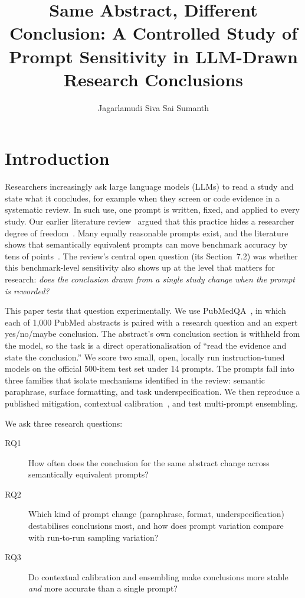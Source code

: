 \documentclass[acmsmall,nonacm]{acmart}
\title{Same Abstract, Different Conclusion: A Controlled Study of Prompt Sensitivity in LLM-Drawn Research Conclusions}
\author{Jagarlamudi Siva Sai Sumanth}
\affiliation{%
  \institution{Indian Institute of Information Technology Allahabad}
  \city{Prayagraj}
  \country{India}}
\begin{document}
\maketitle

\section{Introduction}
\label{sec:intro}

Researchers increasingly ask large language models (LLMs) to read a study and state what it concludes, for example when they screen or code evidence in a systematic review. In such use, one prompt is written, fixed, and applied to every study. Our earlier literature review~\cite{sumanth2026review} argued that this practice hides a researcher degree of freedom~\cite{gelman2013forking}. Many equally reasonable prompts exist, and the literature shows that semantically equivalent prompts can move benchmark accuracy by tens of points~\cite{sclar2024formatting,mizrahi2024stateofwhatart,errica2025sensitivity}. The review's central open question (its Section~7.2) was whether this benchmark-level sensitivity also shows up at the level that matters for research: \emph{does the conclusion drawn from a single study change when the prompt is reworded?}

This paper tests that question experimentally. We use PubMedQA~\cite{jin2019pubmedqa}, in which each of 1{,}000 PubMed abstracts is paired with a research question and an expert yes/no/maybe conclusion. The abstract's own conclusion section is withheld from the model, so the task is a direct operationalisation of ``read the evidence and state the conclusion.'' We score two small, open, locally run instruction-tuned models on the official 500-item test set under 14 prompts. The prompts fall into three families that isolate mechanisms identified in the review: semantic paraphrase, surface formatting, and task underspecification. We then reproduce a published mitigation, contextual calibration~\cite{zhao2021calibrate}, and test multi-prompt ensembling.

We ask three research questions:
\begin{description}
  \item[RQ1] How often does the conclusion for the same abstract change across semantically equivalent prompts?
  \item[RQ2] Which kind of prompt change (paraphrase, format, underspecification) destabilises conclusions most, and how does prompt variation compare with run-to-run sampling variation?
  \item[RQ3] Do contextual calibration and ensembling make conclusions more stable \emph{and} more accurate than a single prompt?
\end{description}
\end{document}
